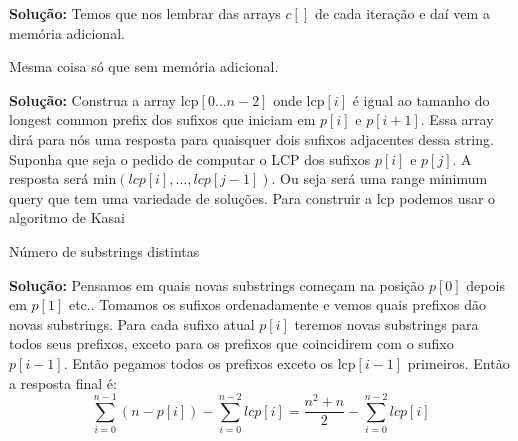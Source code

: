\textbf{Solução:} Temos que nos lembrar das arrays $c[]$ de cada iteração e daí vem a memória adicional.


 Mesma coisa só que sem memória adicional.

\textbf{Solução:} Construa a array $\text{lcp}[0 \dots n-2]$ onde $\text{lcp}[i]$ é igual ao tamanho do longest common prefix dos sufixos que iniciam em $p[i]$ e $p[i+1]$. Essa array dirá para nós uma resposta para quaisquer dois sufixos adjacentes dessa string. Suponha que seja o pedido de computar o LCP dos sufixos $p[i]$ e $p[j]$. A resposta será $\text{min}(lcp[i], \dots, lcp[j-1])$. Ou seja será uma range minimum query que tem uma variedade de soluções. Para construir a lcp podemos usar o algoritmo de Kasai


 Número de substrings distintas

\textbf{Solução:} Pensamos em quais novas substrings começam na posição $p[0]$ depois em $p[1]$ etc.. Tomamos os sufixos ordenadamente e vemos quais prefixos dão novas substrings.  Para cada sufixo atual $p[i]$ teremos novas substrings para todos seus prefixos, exceto para os prefixos que coincidirem com o sufixo $p[i-1]$. Então pegamos todos os prefixos exceto os $\text{lcp}[i-1]$ primeiros. Então a resposta final é:
$$\sum\limits_{i=0}^{n-1} (n - p[i]) - \sum\limits_{i=0}^{n-2} lcp[i] = \dfrac{n^2 + n}{2} - \sum\limits_{i=0}^{n-2} lcp[i]$$


